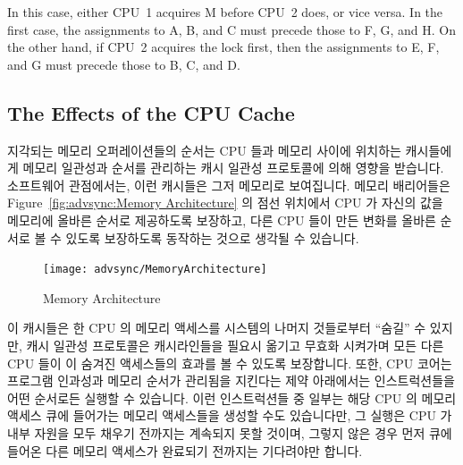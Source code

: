 \begin{enumerate}
In this case, either CPU~1 acquires M before CPU~2 does, or vice versa.
In the first case, the assignments to A, B, and C must precede
those to F, G, and H.
On the other hand, if CPU~2 acquires the lock first, then the
assignments to E, F, and G must precede those to B, C, and D.
\fi

\subsection{The Effects of the CPU Cache}
\label{sec:advsync:The Effects of the CPU Cache}

지각되는 메모리 오퍼레이션들의 순서는 CPU 들과 메모리 사이에 위치하는
캐시들에게 메모리 일관성과 순서를 관리하는 캐시 일관성 프로토콜에 의해 영향을
받습니다.
소프트웨어 관점에서는, 이런 캐시들은 그저 메모리로 보여집니다.
메모리 배리어들은 Figure~\ref{fig:advsync:Memory Architecture} 의 점선 위치에서
CPU 가 자신의 값을 메모리에 올바른 순서로 제공하도록 보장하고, 다른 CPU 들이
만든 변화를 올바른 순서로 볼 수 있도록 보장하도록 동작하는 것으로 생각될 수
있습니다.

\begin{figure}[htb]
\begin{center}
\texttt{[image: advsync/MemoryArchitecture]}
\end{center}
\caption{Memory Architecture}
\end{figure}

이 캐시들은 한 CPU 의 메모리 액세스를 시스템의 나머지 것들로부터 ``숨길'' 수
있지만, 캐시 일관성 프로토콜은 캐시라인들을 필요시 옮기고 무효화 시켜가며 모든
다른 CPU 들이 이 숨겨진 액세스들의 효과를 볼 수 있도록 보장합니다.
또한, CPU 코어는 프로그램 인과성과 메모리 순서가 관리됨을 지킨다는 제약
아래에서는 인스트럭션들을 어떤 순서로든 실행할 수 있습니다.
이런 인스트럭션들 중 일부는 해당 CPU 의 메모리 액세스 큐에 들어가는 메모리
액세스들을 생성할 수도 있습니다만, 그 실행은 CPU 가 내부 자원을 모두 채우기
전까지는 계속되지 못할 것이며, 그렇지 않은 경우 먼저 큐에 들어온 다른 메모리
액세스가 완료되기 전까지는 기다려야만 합니다.
\iffalse


\end{enumerate}

